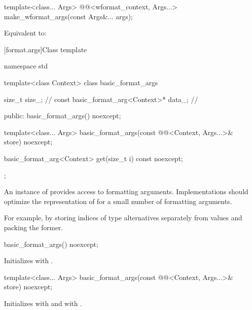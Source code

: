 %
\begin{itemdecl}
template<class... Args>
  @@<wformat_context, Args...> make_wformat_args(const Args&... args);
\end{itemdecl}

\begin{itemdescr}
\pnum
\effects
Equivalent to:
\end{itemdescr}

[format.args]{Class template }

\begin{codeblock}
namespace std {
  template<class Context>
  class basic_format_args {
    size_t size_;                               // \expos
    const basic_format_arg<Context>* data_;     // \expos

  public:
    basic_format_args() noexcept;

    template<class... Args>
      basic_format_args(const @@<Context, Args...>& store) noexcept;

    basic_format_arg<Context> get(size_t i) const noexcept;
  };
}
\end{codeblock}

\pnum
An instance of  provides access to formatting
arguments.
Implementations should
optimize the representation of 
for a small number of formatting arguments.
\begin{note}
For example, by storing indices of type alternatives separately from values
and packing the former.
\end{note}

%
\begin{itemdecl}
basic_format_args() noexcept;
\end{itemdecl}

\begin{itemdescr}
\pnum
\effects
Initializes  with .
\end{itemdescr}

%
\begin{itemdecl}
template<class... Args>
  basic_format_args(const @@<Context, Args...>& store) noexcept;
\end{itemdecl}

\begin{itemdescr}
\pnum
\effects
Initializes
 with  and
 with .
\end{itemdescr}

